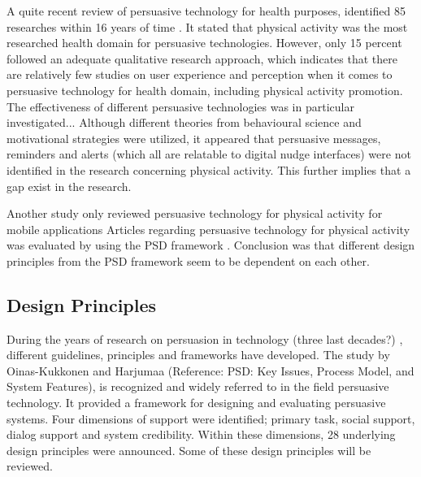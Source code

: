 A quite recent review of persuasive technology for health purposes, identified 85 researches within 16 years of time 
\cite{orji_persuasive_2018}.
It stated that physical activity was the most researched health domain for persuasive technologies. However, only 15 percent followed an adequate qualitative research approach, which indicates that there are relatively few studies on user experience and perception when it comes to persuasive technology for health domain, including physical activity promotion. The effectiveness of different persuasive technologies was in particular investigated... 
Although different theories from behavioural science and motivational strategies were utilized, it appeared that persuasive messages, reminders and alerts (which all are relatable to digital nudge interfaces) were not identified in the research concerning physical activity. This further implies that a gap exist in the research.

Another study only reviewed persuasive technology for physical activity for mobile applications 
\cite{matthews_persuasive_2016}
Articles regarding persuasive technology for physical activity was evaluated by using the PSD framework 
\cite{oinas-kukkonen_persuasive_2009}. Conclusion was that different design principles from the PSD framework seem to be dependent on each other. 

\subsection{Design Principles}
During the years of research on persuasion in technology (three last decades?) , different guidelines, principles and frameworks have developed. The study by Oinas-Kukkonen and Harjumaa (Reference: PSD: Key Issues, Process Model, and System Features), is recognized and widely referred to in the field persuasive technology. It provided a framework for designing and evaluating persuasive systems. Four dimensions of support were identified; primary task, social support, dialog support and system credibility. Within these dimensions, 28 underlying design principles were announced. Some of these design principles will be reviewed. 


